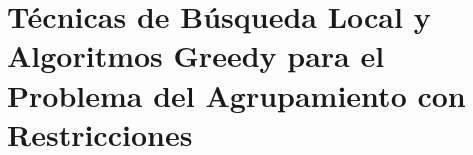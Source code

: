 \chapter{Técnicas de Búsqueda Local y Algoritmos Greedy para el Problema del Agrupamiento con Restricciones}
